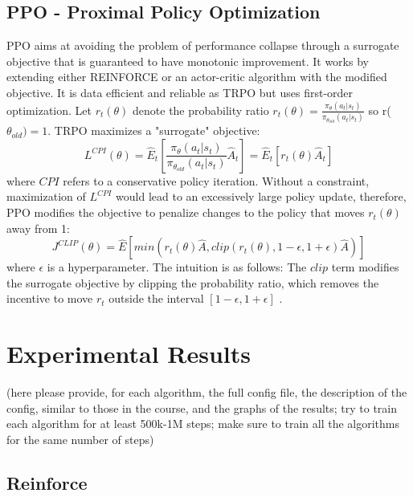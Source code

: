 \documentclass[12pt,a4paper]{report}
\begin{document}
		\section{PPO - Proximal Policy Optimization}
		PPO \cite{schulman_proximal_2017} aims at avoiding the problem of performance collapse through a surrogate objective that is guaranteed to have monotonic improvement. 
		It works by extending either REINFORCE or an actor-critic algorithm with the modified objective. It is data efficient and reliable as TRPO \cite{schulman_trust_2017} but uses first-order optimization.
		Let $r_t(\theta)$ denote the probability ratio $r_t(\theta) = \frac{\pi_\theta(a_t|s_t)}{\pi_{\theta_{old}}(a_t|s_t)}$ so r($\theta_{old}) = 1$. TRPO maximizes a "surrogate" objective: 
		\begin{equation}
			L^{CPI}(\theta) = \hat{E}_t \left[\frac{\pi_\theta(a_t | s_t)}{\pi_{\theta_{old}}(a_t | s_t)}\hat{A}_t\right] = \hat{E}_t\left[r_t(\theta)\hat{A}_t\right]
		\end{equation}
		where $CPI$ refers to a conservative policy iteration.\cite{schulman_proximal_2017}
		Without a constraint, maximization of $L^{CPI}$ would lead to an excessively large policy update, therefore, PPO modifies the objective to penalize changes to the policy that moves $r_t(\theta)$ away from 1:
		\begin{equation}
			J^{CLIP}(\theta) = \hat{E}\left[ min \left( r_t(\theta)\hat{A}, clip\left( r_t(\theta), 1 - \epsilon, 1 + \epsilon \right) \hat{A} \right) \right]
		\end{equation}
		where $\epsilon$ is a hyperparameter. The intuition is as follows: The $clip$ term modifies the surrogate objective by clipping the probability ratio, which removes the incentive to move $r_t$ outside the interval $[1-\epsilon, 1 + \epsilon]$ \cite{schulman_proximal_2017}.
		
		
	\chapter{Experimental Results}
	(here please provide, for each algorithm, the full config file, the description of the config, similar to those in the course, and the graphs of the results; try to train each algorithm for at least 500k-1M steps; make sure to train all the algorithms for the same number of steps)
	\section{Reinforce}
	
\end{document}

